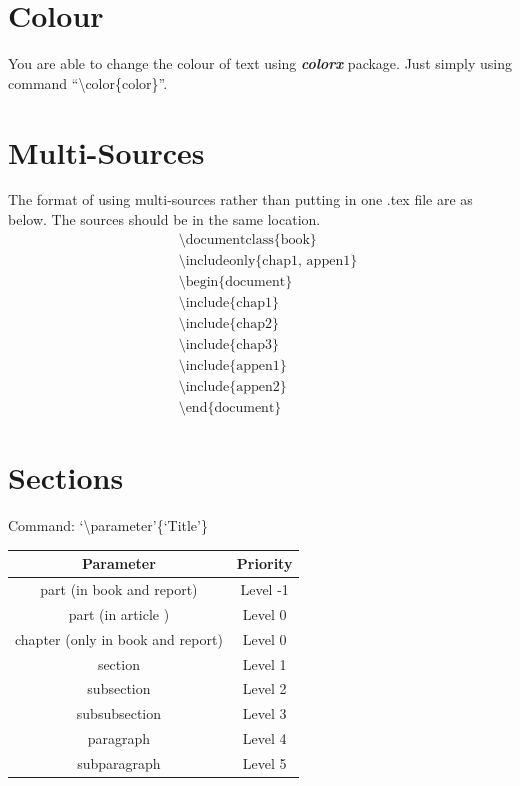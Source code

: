 \documentclass[10pt,a4paper,fleqn]{article}
\def\bslash{\textbackslash} %
\begin{document}
\section{Colour}
You are able to change the colour of text using \textit{\textbf{colorx}} package. Just simply using command ``\bslash color\{color\}''. {\color{blue}{For Example, this is blue text.}} 

\section{Multi-Sources}
The format of using multi-sources rather than putting in one .tex file are as below. The sources should be in the same location.
\begin{align*}
&\text{ \textbackslash documentclass\{book\} }\\  %
&\text{ \textbackslash includeonly\{chap1, appen1\} }\\ %
&\text{ \textbackslash begin\{document\} }\\
&\text{ \textbackslash include\{chap1\} }\\ %
&\text{ \textbackslash include\{chap2\} }\\ %
&\text{ \textbackslash include\{chap3\} }\\ %
&\text{ \textbackslash include\{appen1\} }\\ %
&\text{ \textbackslash include\{appen2\} }\\ %
&\text{ \textbackslash end\{document\} }
\end{align*}

\section{Sections}
Command: `\bslash parameter'\{`Title'\}\\
\begin{tabular}{|c|c|}
\hline
\textbf{Parameter} & \textbf{Priority} \\
\hline
part (in book and report) &Level -1 \\
\hline
part (in article ) &Level 0 \\
\hline
chapter (only in book and report) &Level 0 \\
\hline
section &Level 1 \\
\hline
subsection & Level 2 \\
\hline
subsubsection &Level 3 \\
\hline
paragraph &Level 4 \\
\hline
subparagraph &Level 5 \\
\hline
\end{tabular}
\clearpage
\end{document}
